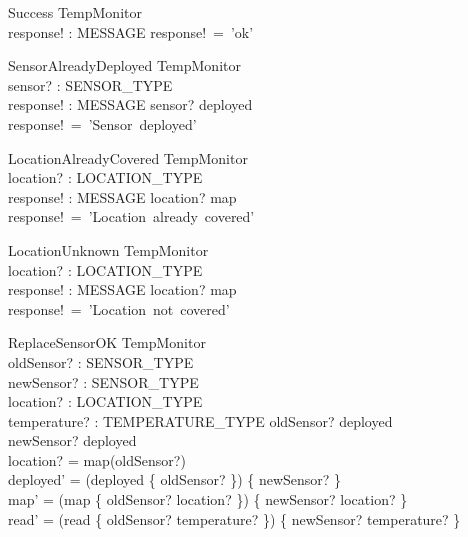 \documentclass[12pt]{article}
\begin{document}
\begin{schema}{Success}
\Xi TempMonitor\\
response! : MESSAGE
\where
response!~=~'ok'\\
\end{schema}



\begin{schema}{SensorAlreadyDeployed}
\Xi TempMonitor\\
sensor? : SENSOR\_TYPE\\
response! : MESSAGE
\where
sensor? \in deployed\\
response!~=~'Sensor~deployed'\\
\end{schema}



\begin{schema}{LocationAlreadyCovered}
\Xi TempMonitor\\
location? : LOCATION\_TYPE\\
response! : MESSAGE
\where
location? \in \ran map\\
response!~=~'Location~already~covered'
\end{schema}



\begin{schema}{LocationUnknown}
\Xi TempMonitor\\
location? : LOCATION\_TYPE\\
response! : MESSAGE
\where
location? \notin \ran map\\
response!~=~'Location~not~covered'
\end{schema}

\begin{schema}{ReplaceSensorOK}
\Delta TempMonitor\\
oldSensor? : SENSOR\_TYPE\\
newSensor? : SENSOR\_TYPE\\
location? : LOCATION\_TYPE\\
temperature? : TEMPERATURE\_TYPE
\where
oldSensor? \in deployed\\
newSensor? \notin deployed\\
location? = map(oldSensor?)\\
deployed' = (deployed \setminus \{ oldSensor? \}) \cup \{ newSensor? \}\\
map' = (map \setminus \{ oldSensor? \mapsto location? \}) \cup \{ newSensor? \mapsto location? \}\\
read' = (read \setminus \{ oldSensor? \mapsto temperature? \}) \cup \{ newSensor? \mapsto temperature? \}
\end{schema}
\end{document}
